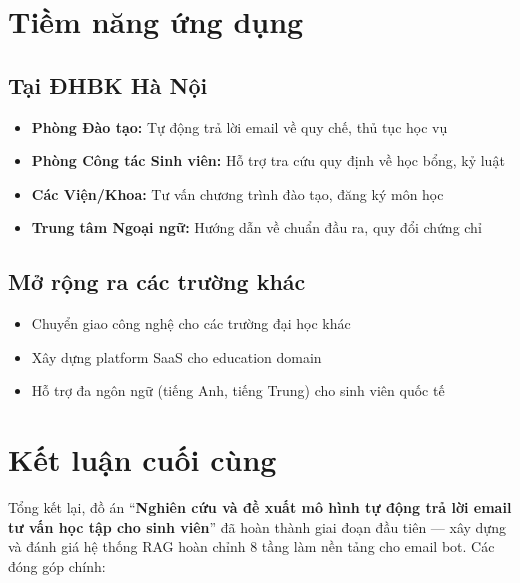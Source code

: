 \documentclass[../DoAn.tex]{subfiles}
\begin{document}
\section{Tiềm năng ứng dụng}

\subsection{Tại ĐHBK Hà Nội}
\begin{itemize}
    \item \textbf{Phòng Đào tạo:} Tự động trả lời email về quy chế, thủ tục học vụ
    \item \textbf{Phòng Công tác Sinh viên:} Hỗ trợ tra cứu quy định về học bổng, kỷ luật
    \item \textbf{Các Viện/Khoa:} Tư vấn chương trình đào tạo, đăng ký môn học
    \item \textbf{Trung tâm Ngoại ngữ:} Hướng dẫn về chuẩn đầu ra, quy đổi chứng chỉ
\end{itemize}

\subsection{Mở rộng ra các trường khác}
\begin{itemize}
    \item Chuyển giao công nghệ cho các trường đại học khác
    \item Xây dựng platform SaaS cho education domain
    \item Hỗ trợ đa ngôn ngữ (tiếng Anh, tiếng Trung) cho sinh viên quốc tế
\end{itemize}

\section{Kết luận cuối cùng}

Tổng kết lại, đồ án ``\textbf{Nghiên cứu và đề xuất mô hình tự động trả lời email tư vấn học tập cho sinh viên}'' đã hoàn thành giai đoạn đầu tiên --- xây dựng và đánh giá hệ thống RAG hoàn chỉnh 8 tầng làm nền tảng cho email bot. Các đóng góp chính:
\end{document}
